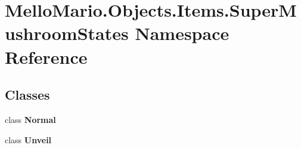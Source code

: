 \section{Mello\+Mario.\+Objects.\+Items.\+Super\+Mushroom\+States Namespace Reference}
\label{namespaceMelloMario_1_1Objects_1_1Items_1_1SuperMushroomStates}
\subsection*{Classes}
\begin{DoxyCompactItemize}
\item 
class \textbf{ Normal}
\item 
class \textbf{ Unveil}
\end{DoxyCompactItemize}
